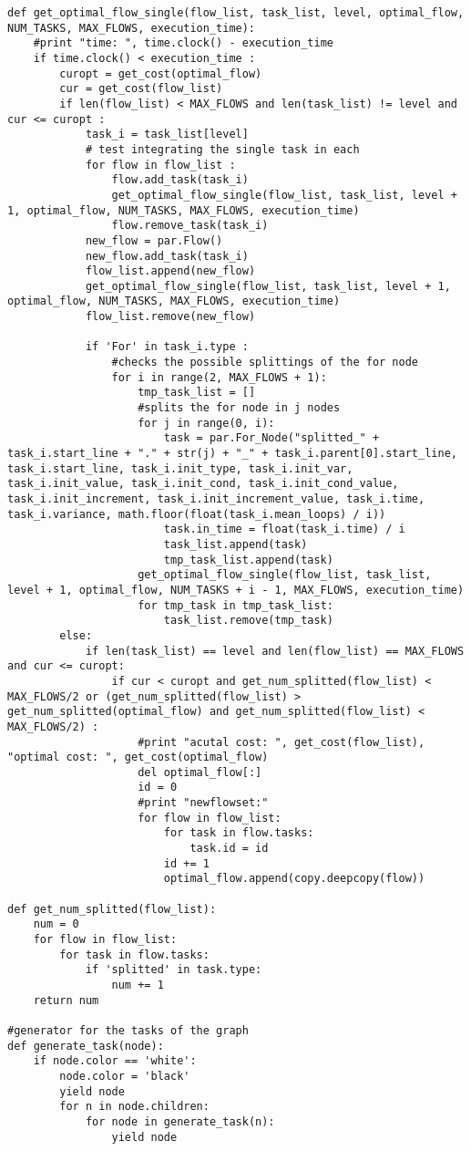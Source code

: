 \documentclass[a4paper,11pt,twoside]{book}
\begin{document}
\begin{lstlisting}[language=CCC, caption=graphCreator.py]
def get_optimal_flow_single(flow_list, task_list, level, optimal_flow, NUM_TASKS, MAX_FLOWS, execution_time):
	#print "time: ", time.clock() - execution_time
	if time.clock() < execution_time :
		curopt = get_cost(optimal_flow)
		cur = get_cost(flow_list)
		if len(flow_list) < MAX_FLOWS and len(task_list) != level and cur <= curopt :
			task_i = task_list[level]
			# test integrating the single task in each
			for flow in flow_list :
				flow.add_task(task_i)
				get_optimal_flow_single(flow_list, task_list, level + 1, optimal_flow, NUM_TASKS, MAX_FLOWS, execution_time)
				flow.remove_task(task_i)
			new_flow = par.Flow()		
			new_flow.add_task(task_i)
			flow_list.append(new_flow)
			get_optimal_flow_single(flow_list, task_list, level + 1, optimal_flow, NUM_TASKS, MAX_FLOWS, execution_time)
			flow_list.remove(new_flow)

			if 'For' in task_i.type :
				#checks the possible splittings of the for node
				for i in range(2, MAX_FLOWS + 1):
					tmp_task_list = []
					#splits the for node in j nodes
					for j in range(0, i):
						task = par.For_Node("splitted_" + task_i.start_line + "." + str(j) + "_" + task_i.parent[0].start_line, task_i.start_line, task_i.init_type, task_i.init_var, task_i.init_value, task_i.init_cond, task_i.init_cond_value, task_i.init_increment, task_i.init_increment_value, task_i.time, task_i.variance, math.floor(float(task_i.mean_loops) / i))
						task.in_time = float(task_i.time) / i
						task_list.append(task)
						tmp_task_list.append(task)
					get_optimal_flow_single(flow_list, task_list, level + 1, optimal_flow, NUM_TASKS + i - 1, MAX_FLOWS, execution_time)
					for tmp_task in tmp_task_list:
						task_list.remove(tmp_task)		
		else:
			if len(task_list) == level and len(flow_list) == MAX_FLOWS and cur <= curopt:
				if cur < curopt and get_num_splitted(flow_list) <  MAX_FLOWS/2 or (get_num_splitted(flow_list) > get_num_splitted(optimal_flow) and get_num_splitted(flow_list) <  MAX_FLOWS/2) :
					#print "acutal cost: ", get_cost(flow_list), "optimal cost: ", get_cost(optimal_flow)
					del optimal_flow[:]
					id = 0
					#print "newflowset:"
					for flow in flow_list:
						for task in flow.tasks:
							task.id = id
						id += 1
						optimal_flow.append(copy.deepcopy(flow))

def get_num_splitted(flow_list):
	num = 0
	for flow in flow_list:
		for task in flow.tasks:
			if 'splitted' in task.type:
				num += 1
	return num

#generator for the tasks of the graph
def generate_task(node):
	if node.color == 'white':
		node.color = 'black'
		yield node
		for n in node.children:
			for node in generate_task(n):
				yield node


\end{lstlisting}
\end{document}
